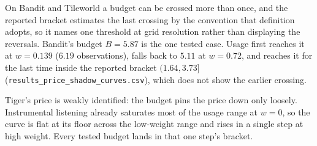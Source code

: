 \documentclass[manuscript, screen, review]{jair}
\begin{document}
On Bandit and Tileworld a budget can be crossed more than once, and the reported bracket estimates the last crossing by the convention that definition adopts, so it names one threshold at grid resolution rather than displaying the reversals. Bandit's budget $B{=}5.87$ is the one tested case. Usage first reaches it at $w{=}0.139$ ($6.19$ observations), falls back to $5.11$ at $w{=}0.72$, and reaches it for the last time inside the reported bracket $(1.64, 3.73]$ (\texttt{results\_\allowbreak price\_\allowbreak shadow\_\allowbreak curves.csv}), which does not show the earlier crossing.

Tiger's price is weakly identified: the budget pins the price down only loosely. Instrumental listening already saturates most of the usage range at $w{=}0$, so the curve is flat at its floor across the low-weight range and rises in a single step at high weight. Every tested budget lands in that one step's bracket.
\end{document}
